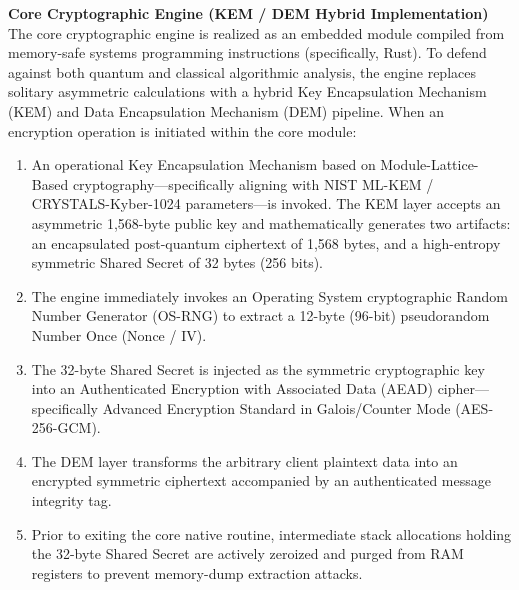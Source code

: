 \documentclass[12pt, a4paper]{article}
\begin{document}
\vspace{0.5em}
\noindent \textbf{Core Cryptographic Engine (KEM / DEM Hybrid Implementation)} \\
The core cryptographic engine is realized as an embedded module compiled from memory-safe systems programming instructions (specifically, Rust). To defend against both quantum and classical algorithmic analysis, the engine replaces solitary asymmetric calculations with a hybrid Key Encapsulation Mechanism (KEM) and Data Encapsulation Mechanism (DEM) pipeline.
When an encryption operation is initiated within the core module:
\begin{enumerate}
    \item An operational Key Encapsulation Mechanism based on Module-Lattice-Based cryptography—specifically aligning with NIST ML-KEM / CRYSTALS-Kyber-1024 parameters—is invoked. The KEM layer accepts an asymmetric 1,568-byte public key and mathematically generates two artifacts: an encapsulated post-quantum ciphertext of 1,568 bytes, and a high-entropy symmetric Shared Secret of 32 bytes (256 bits).
    \item The engine immediately invokes an Operating System cryptographic Random Number Generator (OS-RNG) to extract a 12-byte (96-bit) pseudorandom Number Once (Nonce / IV).
    \item The 32-byte Shared Secret is injected as the symmetric cryptographic key into an Authenticated Encryption with Associated Data (AEAD) cipher—specifically Advanced Encryption Standard in Galois/Counter Mode (AES-256-GCM). 
    \item The DEM layer transforms the arbitrary client plaintext data into an encrypted symmetric ciphertext accompanied by an authenticated message integrity tag.
    \item Prior to exiting the core native routine, intermediate stack allocations holding the 32-byte Shared Secret are actively zeroized and purged from RAM registers to prevent memory-dump extraction attacks.
\end{enumerate}
\end{document}
